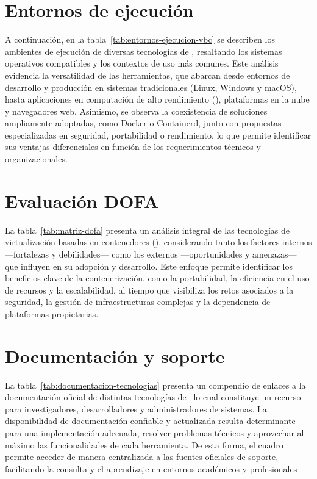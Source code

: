 \section{Entornos de ejecución}
\noindent
A continuación, en la tabla~\ref{tab:entornos-ejecucion-vbc} se describen los ambientes de ejecución de diversas tecnologías de \VBC, resaltando los sistemas operativos compatibles y los contextos de uso más comunes. Este análisis evidencia la versatilidad de las herramientas, que abarcan desde entornos de desarrollo y producción en sistemas tradicionales (Linux, Windows y macOS), hasta aplicaciones en computación de alto rendimiento (\HPC), plataformas en la nube y navegadores web. Asimismo, se observa la coexistencia de soluciones ampliamente adoptadas, como Docker o Containerd, junto con propuestas especializadas en seguridad, portabilidad o rendimiento, lo que permite identificar sus ventajas diferenciales en función de los requerimientos técnicos y organizacionales.


\section{Evaluación DOFA}
\noindent
La tabla~\ref{tab:matriz-dofa} presenta un análisis integral de las tecnologías de virtualización basadas en contenedores (\VBC), considerando tanto los factores internos —fortalezas y debilidades— como los externos —oportunidades y amenazas— que influyen en su adopción y desarrollo. Este enfoque permite identificar los beneficios clave de la contenerización, como la portabilidad, la eficiencia en el uso de recursos y la escalabilidad, al tiempo que visibiliza los retos asociados a la seguridad, la gestión de infraestructuras complejas y la dependencia de plataformas propietarias.
 

\clearpage
\section{Documentación y soporte}
\noindent
La tabla~\ref{tab:documentacion-tecnologias} presenta un compendio de enlaces a la documentación oficial de distintas tecnologías de \VBC\, lo cual constituye un recurso para investigadores, desarrolladores y administradores de sistemas. La disponibilidad de documentación confiable y actualizada resulta determinante para una implementación adecuada, resolver problemas técnicos y aprovechar al máximo las funcionalidades de cada herramienta. De esta forma, el cuadro permite acceder de manera centralizada a las fuentes oficiales de soporte, facilitando la consulta y el aprendizaje en entornos académicos y profesionales
